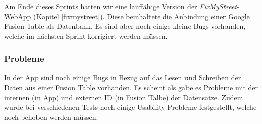 Am Ende dieses Sprints hatten wir eine lauffähige Version der \emph{FixMyStreet}-WebApp (Kapitel \ref{fixmystreet}). Diese beinhaltete die Anbindung einer Google Fusion Table als Datenbank. Es sind aber noch einige kleine Bugs vorhanden, welche im nächsten Sprint korrigiert werden müssen.

\subsubsection{Probleme}
In der App sind noch einige Bugs in Bezug auf das Lesen und Schreiben der Daten aus einer Fusion Table vorhanden. Es scheint als gäbe es Probleme mit der internen (in App) und externen ID (in Fusion Talbe) der Datensätze. Zudem wurde bei verschiedenen Tests noch einige Usability-Probleme festgestellt, welche noch behoben werden müssen.